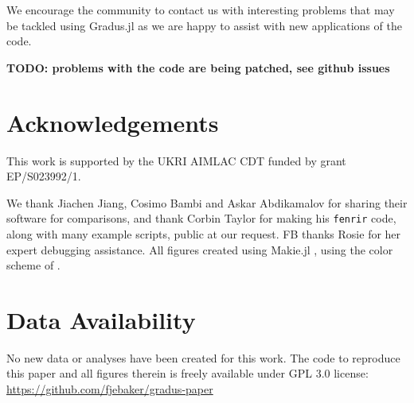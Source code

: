 \documentclass[fleqn,usenatbib]{mnras}
\newcommand{\todo}[1]{{\noindent \bf \color{red} TODO: #1}}
\newcommand{\Gradus}{Gradus.jl }
\begin{document}
We encourage the community to contact us with interesting problems that may be tackled using \Gradus as we are happy to assist with new applications of the code.

\todo{problems with the code are being patched, see github issues}

\section*{Acknowledgements}
This work is supported by the UKRI AIMLAC CDT funded by grant EP/S023992/1.

We thank Jiachen Jiang, Cosimo Bambi and Askar Abdikamalov for sharing their
software for comparisons, and thank Corbin Taylor for making his
\texttt{fenrir} code, along with many example scripts, public at our request. FB thanks Rosie for her expert debugging assistance. All figures created using Makie.jl \citep{DanischKrumbiegel2021}, using the color scheme of \cite{wong_points_2011}.

\section*{Data Availability}

No new data or analyses have been created for this work. The code to reproduce
this paper and all figures therein is freely available under GPL 3.0 license:
\url{https://github.com/fjebaker/gradus-paper}








\end{document}
